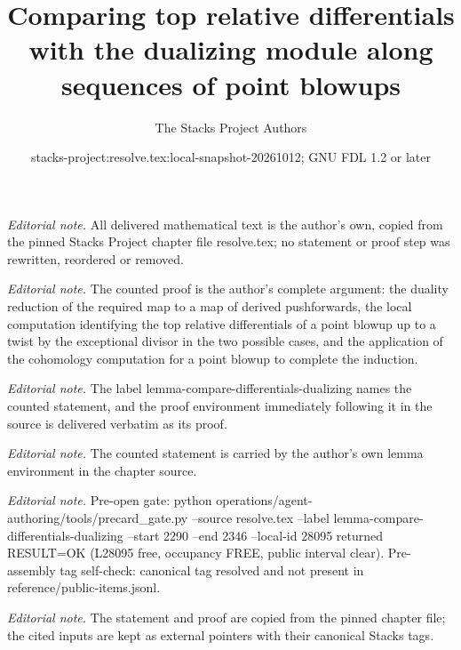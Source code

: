 \documentclass[10pt,a4paper]{amsart}
\title{Comparing top relative differentials with the dualizing module along sequences of point blowups}
\author{The Stacks Project Authors}
\date{stacks-project:resolve.tex:local-snapshot-20261012; GNU FDL 1.2 or later}
\theoremstyle{plain}
\theoremstyle{definition}
\theoremstyle{remark}
\numberwithin{equation}{subsection}
\begin{document}
\maketitle
\noindent\textit{Editorial note.} All delivered mathematical text is the author's own, copied from the pinned Stacks Project chapter file resolve.tex; no statement or proof step was rewritten, reordered or removed.\par\medskip
\noindent\textit{Editorial note.} The counted proof is the author's complete argument: the duality reduction of the required map to a map of derived pushforwards, the local computation identifying the top relative differentials of a point blowup up to a twist by the exceptional divisor in the two possible cases, and the application of the cohomology computation for a point blowup to complete the induction.\par\medskip
\noindent\textit{Editorial note.} The label lemma-compare-differentials-dualizing names the counted statement, and the proof environment immediately following it in the source is delivered verbatim as its proof.\par\medskip
\noindent\textit{Editorial note.} The counted statement is carried by the author's own lemma environment in the chapter source.\par\medskip
\noindent\textit{Editorial note.} Pre-open gate: python operations/agent-authoring/tools/precard\_gate.py --source resolve.tex --label lemma-compare-differentials-dualizing --start 2290 --end 2346 --local-id 28095 returned RESULT=OK (L28095 free, occupancy FREE, public interval clear). Pre-assembly tag self-check: canonical tag resolved and not present in reference/public-items.jsonl.\par\medskip
\noindent\textit{Editorial note.} The statement and proof are copied from the pinned chapter file; the cited inputs are kept as external pointers with their canonical Stacks tags.\par\medskip
\end{document}
